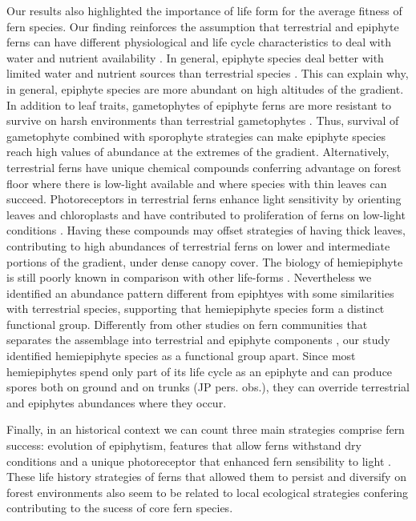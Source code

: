 \documentclass[12pt]{article}
\begin{document}
Our results also highlighted the importance of life form for the average fitness of fern species. Our finding reinforces the assumption that terrestrial and epiphyte ferns can have different physiological and life cycle characteristics to deal with water and nutrient availability \citep{Page2002, Watkins2012}. In general, epiphyte species deal better with limited water and nutrient sources than terrestrial species \citep{Page2002, Schuettpelz2009, Watkins2012}. This can explain why, in general, epiphyte species are more  abundant on high altitudes of the gradient. In addition to leaf traits, gametophytes of epiphyte ferns are more resistant to survive on harsh environments than terrestrial gametophytes \citep{Watkins2012}. Thus, survival of gametophyte combined with sporophyte strategies can make epiphyte species reach high values of abundance at the extremes of the gradient. Alternatively, terrestrial ferns have unique chemical compounds conferring advantage on forest floor where there is low-light available \citep{Kawai2003} and where species with thin leaves can succeed. Photoreceptors in terrestrial ferns enhance light sensitivity by orienting leaves and chloroplasts and have contributed to proliferation of ferns on low-light conditions \citep{Kawai2003}. Having these compounds may offset strategies of having thick leaves, contributing to high abundances of terrestrial ferns on lower and intermediate portions of the gradient, under dense canopy
cover. The biology of hemiepiphyte is still poorly known in comparison with other life-forms \citep{Watkins2012}. Nevertheless we identified an abundance pattern different from epiphtyes with some similarities with terrestrial species, supporting that hemiepiphyte species form a distinct functional group. Differently from other studies on fern communities that separates the assemblage
into terrestrial and epiphyte components \citep{WatkinsJr2006, Kluge2010}, our study identified hemiepiphyte species as a functional group apart. Since most hemiepiphytes spend only part of its life cycle as an epiphyte and can produce spores both on ground and on trunks (JP pers. obs.), they can override terrestrial and epiphytes abundances where they occur. 

Finally, in an historical context we can count three main strategies comprise fern success: evolution of epiphytism, features that allow ferns withstand dry conditions and a unique photoreceptor that enhanced fern sensibility to light \citep{Schneider2004, Schuettpelz2009}. These life history strategies of ferns that allowed them to persist and diversify on forest environments also seem to be related to local ecological
strategies confering contributing to the sucess of core fern species. 
\end{document}
